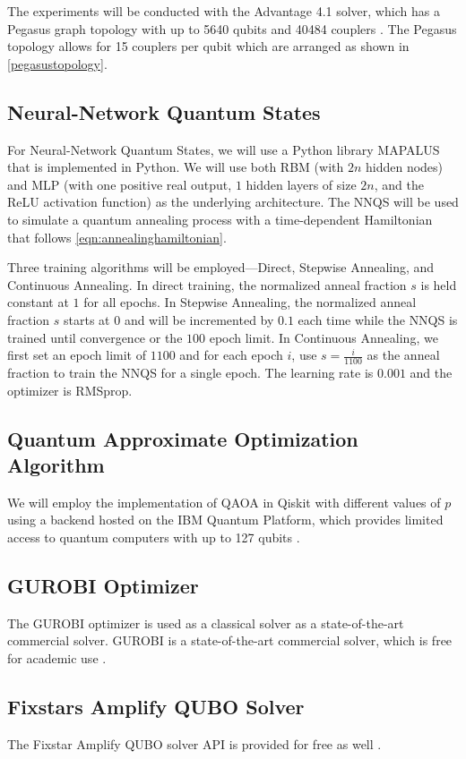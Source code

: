 The experiments will be conducted with the Advantage 4.1 solver, which has a Pegasus graph topology with up to 5640 qubits and 40484 couplers \cite{dwaveadvantage}. The Pegasus topology allows for 15 couplers per qubit which are arranged as shown in \autoref{pegasustopology}.


\subsection{Neural-Network Quantum States}
For Neural-Network Quantum States, we will use a Python library MAPALUS that is implemented in Python. We will use both RBM (with $2n$ hidden nodes) and MLP (with one positive real output, $1$ hidden layers of size $2n$, and the ReLU activation function) as the underlying architecture. The NNQS will be used to simulate a quantum annealing process with a time-dependent Hamiltonian that follows \autoref{eqn:annealinghamiltonian}. 

Three training algorithms will be employed---Direct, Stepwise Annealing, and Continuous Annealing. In direct training, the normalized anneal fraction $s$ is held constant at $1$ for all epochs. In Stepwise Annealing, the normalized anneal fraction $s$ starts at $0$ and will be incremented by $0.1$ each time while the NNQS is trained until convergence or the $100$ epoch limit. In Continuous Annealing, we first set an epoch limit of $1100$ and for each epoch $i$, use $s = \frac{i}{1100}$ as the anneal fraction to train the NNQS for a single epoch. The learning rate is $0.001$ and the optimizer is RMSprop.

\subsection{Quantum Approximate Optimization Algorithm}
We will employ the implementation of QAOA in Qiskit with different values of $p$ using a backend hosted on the IBM Quantum Platform, which provides limited access to quantum computers with up to 127 qubits \cite{b24}.

\subsection{GUROBI Optimizer}
The GUROBI optimizer is used as a classical solver as a state-of-the-art commercial solver. GUROBI is a state-of-the-art commercial solver, which is free for academic use \cite{b26}.

\subsection{Fixstars Amplify QUBO Solver}
The Fixstar Amplify QUBO solver API is provided for free as well \cite{b12}.


